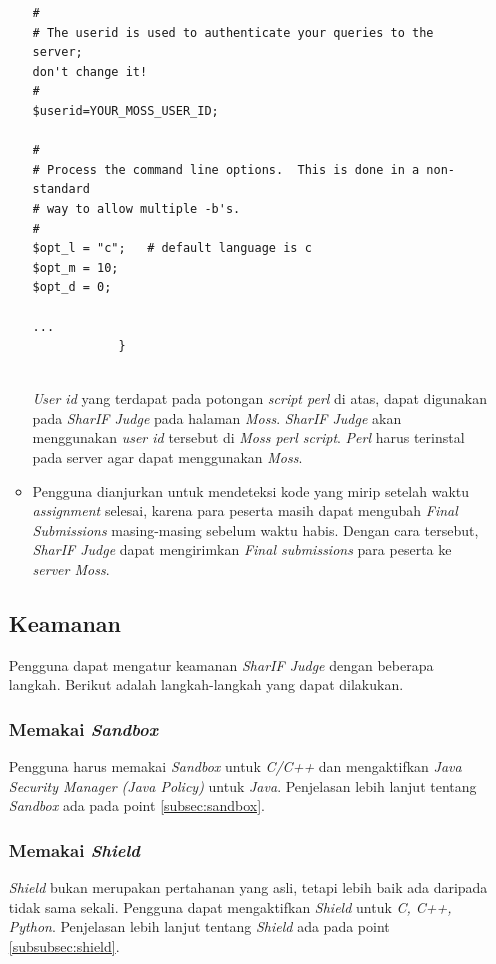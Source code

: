 \documentclass[a4paper,twoside]{article}
\begin{document}
\begin{enumerate}
\begin{itemize}
\begin{lstlisting}[basicstyle=\ttfamily, frame=single,
			columns=fullflexible, keepspaces=true, breaklines=true, label=ls:12, caption=Potongan \textit{script perl}]
#
# The userid is used to authenticate your queries to the server; 
don't change it!
#
$userid=YOUR_MOSS_USER_ID;

#
# Process the command line options.  This is done in a non-standard
# way to allow multiple -b's.
#
$opt_l = "c";   # default language is c
$opt_m = 10;
$opt_d = 0;

...
			}
			
			\end{lstlisting}
			
			\textit{User id} yang terdapat pada potongan \textit{script perl} di atas, dapat digunakan pada \textit{SharIF Judge} pada halaman \textit{Moss}. \textit{SharIF Judge} akan menggunakan \textit{user id} tersebut di \textit{Moss perl script}. \textit{Perl} harus terinstal pada server agar dapat menggunakan \textit{Moss}.  
			
			\item Pengguna dianjurkan untuk mendeteksi kode yang mirip setelah waktu \textit{assignment} selesai, karena para peserta masih dapat mengubah \textit{Final Submissions} masing-masing sebelum waktu habis. Dengan cara tersebut, \textit{SharIF Judge} dapat mengirimkan \textit{Final submissions} para peserta ke \textit{server Moss}.
		\end{itemize}
		
		\subsection*{Keamanan}
		\label{subsec:keamanan}
		Pengguna dapat mengatur keamanan \textit{SharIF Judge} dengan beberapa langkah. Berikut adalah langkah-langkah yang dapat dilakukan.
		
		\subsubsection*{Memakai \textit{Sandbox}}
		\label{subsubsec:memakai_sandbox}
		Pengguna harus memakai \textit{Sandbox} untuk \textit{C/C++} dan mengaktifkan \textit{Java Security Manager (Java Policy)} untuk \textit{Java}. Penjelasan lebih lanjut tentang \textit{Sandbox} ada pada point \ref{subsec:sandbox}.
		
		\subsubsection*{Memakai \textit{Shield}}
		\label{subsubsec:memakai_shield}
		\textit{Shield} bukan merupakan pertahanan yang asli, tetapi lebih baik ada daripada tidak sama sekali. Pengguna dapat mengaktifkan \textit{Shield} untuk \textit{C, C++, Python}. Penjelasan lebih lanjut tentang \textit{Shield} ada pada point \ref{subsubsec:shield}.
		

\end{enumerate}
\end{document}
